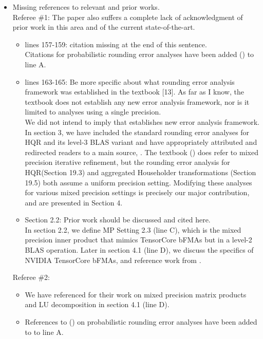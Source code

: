 \documentclass[10pt]{article}
\begin{document}
\begin{itemize}\bfseries
	\item Missing references to relevant and prior works.\\
	Referee \#1: The paper also suffers a complete lack of acknowledgment of prior work in this area and of the current state-of-the-art.
	\begin{itemize}\bfseries
		\item lines 157-159: citation missing at the end of this sentence. \\
		{\normalfont
		Citations for probabilistic rounding error analyses have been added (\cite{Higham2019a,Ipsen2019}) to line A. 
		}
		\item lines 163-165: Be more specific about what rounding error analysis framework was established in the textbook [13]. As far as I know, the textbook does not establish any new error analysis framework, nor is it limited to analyses using a single precision.\\
		{\normalfont
		We did not intend to imply that \cite{Higham2002} establishes new error analysis framework. 
		In section 3, we have included the standard rounding error analyses for HQR and its level-3 BLAS variant and have appropriately attributed and redirected readers to a main source, \cite{Higham2002}. 
		The textbook (\cite{Higham2002}) does refer to mixed precision iterative refinement, but the rounding error analysis for HQR(Section 19.3) and aggregated Householder transformations (Section 19.5) both assume a uniform precision setting. 
		Modifying these analyses for various mixed precision settings is precisely our major contribution, and are presented in Section 4.
	    } 
		\item Section 2.2: Prior work should be discussed and cited here.\\
		{\normalfont
		In section 2.2, we define MP Setting 2.3 (line C), which is the mixed precision inner product that mimics TensorCore bFMAs but in a level-2 BLAS operation.
		Later in section 4.1 (line D), we discuss the specifics of NVIDIA TensorCore bFMAs, and reference work from \cite{Blanchard2019}. 
		}
	\end{itemize}
    Referee \#2:
    \begin{itemize}\normalfont
    	\item We have referenced \cite{Blanchard2019} for their work on mixed precision matrix products and LU decomposition in section 4.1 (line D).
    	\item References to (\cite{Higham2019a,Ipsen2019}) on probabilistic rounding error analyses have been added to to line A. 

\end{itemize}
\end{itemize}
\end{document}
